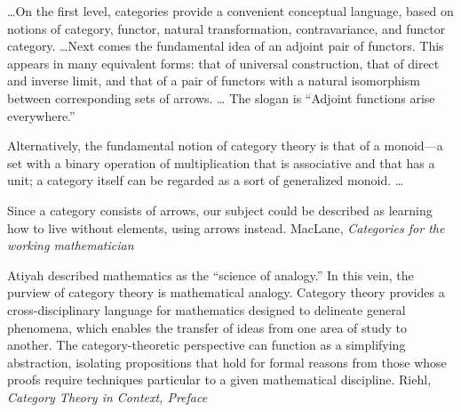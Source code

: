 \documentclass[11pt,openany]{book}
\begin{document}
\begin{boxquote}
\ldots On the first level, categories provide
a convenient conceptual language, based on notions of category, 
functor, natural transformation, contravariance, and
functor category.
\ldots Next comes the fundamental idea of an adjoint pair of functors.
This appears in many equivalent forms: that of universal construction,
that of direct and inverse limit, 
and that of a pair of functors with a natural isomorphism between
corresponding sets of arrows. \ldots
The slogan is ``Adjoint functions arise everywhere.''
\par
Alternatively, the fundamental notion of category theory is that
of a monoid---a set with a binary operation of multiplication
that is associative and that has a unit;
a category itself can be regarded as a sort of generalized monoid.
\ldots
\par
Since a category consists of arrows, our subject could be 
described as learning how to live without elements, using arrows
instead.
\tcblower
{MacLane, \textit{Categories for the working
mathematician}~\cite{maclane_1998_cat_for_working_mathematician}}
\end{boxquote}

\begin{boxquote}
Atiyah described mathematics as the
``science of analogy.'' In this vein, the purview
of category theory is mathematical analogy. 
Category theory provides a cross-disciplinary
language for mathematics designed to delineate general phenomena,
which enables the
transfer of ideas from one area of study to another. 
The category-theoretic perspective can
function as a simplifying abstraction, isolating propositions 
that hold for formal reasons
from those whose proofs require techniques particular 
to a given mathematical discipline.
\tcblower
{Riehl, 
\textit{Category Theory in Context, Preface
}~\cite{riehl_2017_cath_in_context}}
\end{boxquote}
\end{document}
